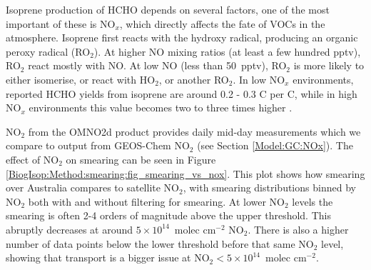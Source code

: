       Isoprene production of HCHO depends on several factors, one of the most important of these is NO$_x$, which directly affects the fate of VOCs in the atmosphere.
      Isoprene first reacts with the hydroxy radical, producing an organic peroxy radical (RO$_2$).
      At higher NO mixing ratios (at least a few hundred pptv), RO$_2$ react mostly with NO. 
      At low NO (less than 50~pptv), RO$_2$ is more likely to either isomerise, or react with HO$_2$, or another RO$_2$.
      In low NO$_x$ environments, reported HCHO yields from isoprene are around 0.2 - 0.3 C per C, while in high NO$_x$ environments this value becomes two to three times higher \parencite{Palmer2003, Wolfe2016}.

      
      NO$_2$ from the OMNO2d product provides daily mid-day measurements which we compare to output from GEOS-Chem NO$_2$ (see Section \ref{Model:GC:NOx}).
      The effect of NO$_2$ on smearing can be seen in Figure \ref{BiogIsop:Method:smearing:fig_smearing_vs_nox}.
      This plot shows how smearing over Australia compares to satellite NO$_2$, with smearing distributions binned by NO$_2$ both with and without filtering for smearing.
      At lower NO$_2$ levels the smearing is often 2-4 orders of magnitude above the upper threshold. 
      This abruptly decreases at around $5 \times 10^{14} $~molec cm$^{-2}$ NO$_2$.
      There is also a higher number of data points below the lower threshold before that same NO$_2$ level, showing that transport is a bigger issue at NO$_2 < 5 \times 10^{14} $~molec cm$^{-2}$. 
      
      
